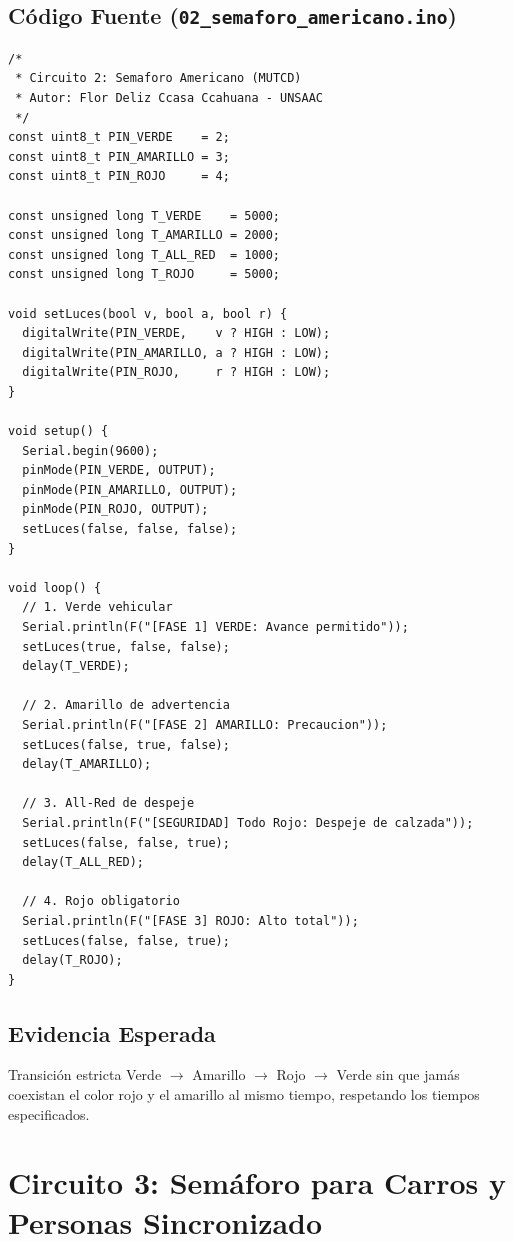 \documentclass[12pt,a4paper]{article}
\begin{document}
\subsection{Código Fuente (\texttt{02\_semaforo\_americano.ino})}
\begin{lstlisting}
/*
 * Circuito 2: Semaforo Americano (MUTCD)
 * Autor: Flor Deliz Ccasa Ccahuana - UNSAAC
 */
const uint8_t PIN_VERDE    = 2;
const uint8_t PIN_AMARILLO = 3;
const uint8_t PIN_ROJO     = 4;

const unsigned long T_VERDE    = 5000;
const unsigned long T_AMARILLO = 2000;
const unsigned long T_ALL_RED  = 1000;
const unsigned long T_ROJO     = 5000;

void setLuces(bool v, bool a, bool r) {
  digitalWrite(PIN_VERDE,    v ? HIGH : LOW);
  digitalWrite(PIN_AMARILLO, a ? HIGH : LOW);
  digitalWrite(PIN_ROJO,     r ? HIGH : LOW);
}

void setup() {
  Serial.begin(9600);
  pinMode(PIN_VERDE, OUTPUT);
  pinMode(PIN_AMARILLO, OUTPUT);
  pinMode(PIN_ROJO, OUTPUT);
  setLuces(false, false, false);
}

void loop() {
  // 1. Verde vehicular
  Serial.println(F("[FASE 1] VERDE: Avance permitido"));
  setLuces(true, false, false);
  delay(T_VERDE);

  // 2. Amarillo de advertencia
  Serial.println(F("[FASE 2] AMARILLO: Precaucion"));
  setLuces(false, true, false);
  delay(T_AMARILLO);

  // 3. All-Red de despeje
  Serial.println(F("[SEGURIDAD] Todo Rojo: Despeje de calzada"));
  setLuces(false, false, true);
  delay(T_ALL_RED);

  // 4. Rojo obligatorio
  Serial.println(F("[FASE 3] ROJO: Alto total"));
  setLuces(false, false, true);
  delay(T_ROJO);
}
\end{lstlisting}

\subsection{Evidencia Esperada}
Transición estricta Verde $\rightarrow$ Amarillo $\rightarrow$ Rojo $\rightarrow$ Verde sin que jamás coexistan el color rojo y el amarillo al mismo tiempo, respetando los tiempos especificados.

\section{Circuito 3: Semáforo para Carros y Personas Sincronizado}
\end{document}
